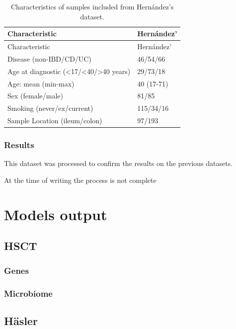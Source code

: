 \documentclass[
  a4paper,
]{book}
\begin{document}
\begin{longtable}[]{@{}ll@{}}
\caption{\label{tab:hernandez} Characteristics of samples included from Hernández's dataset.}\tabularnewline
\toprule
Characteristic & Hernández' \\
\midrule
\endfirsthead
\toprule
Characteristic & Hernández' \\
\midrule
\endhead
Disease (non-IBD/CD/UC) & 46/54/66 \\
Age at diagnostic (\textless17/\textless40/\textgreater40 years) & 29/73/18 \\
Age: mean (min-max) & 40 (17-71) \\
Sex (female/male) & 81/85 \\
Smoking (never/ex/current) & 115/34/16 \\
Sample Location (ileum/colon) & 97/193 \\
\bottomrule
\end{longtable}

\hypertarget{results-hernandez}{%
\subsection{Results}\label{results-hernandez}}

This dataset was processed to confirm the results on the previous datasets.

At the time of writing the process is not complete

\hypertarget{models-output}{%
\chapter{Models output}\label{models-output}}

\hypertarget{hsct}{%
\section{HSCT}\label{hsct}}

\hypertarget{genes}{%
\subsection{Genes}\label{genes}}

\hypertarget{microbiome-2}{%
\subsection{Microbiome}\label{microbiome-2}}

\hypertarget{huxe4sler}{%
\section{Häsler}\label{huxe4sler}}
\end{document}
